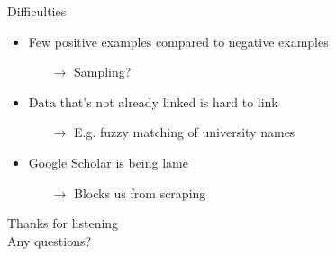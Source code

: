 \documentclass[nonav,sleutel]{beamer}
\begin{document}
\begin{frame}{Difficulties}
\begin{itemize}
	\item<1-> Few positive examples compared to negative examples
		\begin{itemize}
			\item[$\rightarrow$] Sampling?
		\end{itemize}
	\item<2-> Data that's not already linked is hard to link
		\begin{itemize}
			\item[$\rightarrow$] E.g. fuzzy matching of university names
		\end{itemize}
	\item<3-> Google Scholar is being lame
		\begin{itemize}
			\item[$\rightarrow$] Blocks us from scraping
		\end{itemize}
\end{itemize}
\end{frame}

\begin{frame}
\begin{center}
\Large{Thanks for listening}\\
Any questions?
\end{center}

\end{frame}
\end{document}
